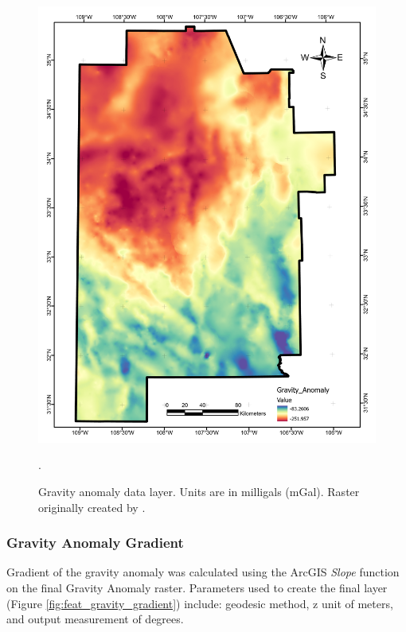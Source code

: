 \begin{figure}[!htp]
\centering
\includegraphics[scale=.50]{templates/images/Figure-GravityAnomaly.pdf}
\caption[Gravity anomaly data layer]{Gravity anomaly data layer. Units are in milligals (mGal). Raster originally created by \protect\citet{bielicki_hydrogeolgic_2015}.}.
\label{fig:feat_gravity}
\end{figure}

\subsubsection{Gravity Anomaly Gradient}

Gradient of the gravity anomaly was calculated using the ArcGIS \textit{Slope} function on the final Gravity Anomaly raster. Parameters used to create the final layer (Figure \ref{fig:feat_gravity_gradient}) include: geodesic method, z unit of meters, and output measurement of degrees.

